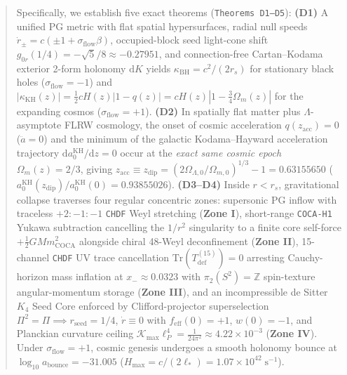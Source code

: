 \documentclass[11pt,a4paper]{article}
\theoremstyle{remark}
\begin{document}
\begin{abstract}
Specifically, we establish five exact theorems (\texttt{Theorems D1--D5}):
\textbf{(D1)} A unified PG metric with flat spatial hypersurfaces, radial null speeds $\dot{r}_\pm = c(\pm 1 + \sigma_{\mathrm{flow}}\beta)$, occupied-block seed light-cone shift $g_{0r}(1/4) = -\sqrt{5}/8 \approx -0.27951$, and connection-free Cartan--Kodama exterior 2-form holonomy $\mathrm{d}K$ yields $\kappa_{\mathrm{BH}} = c^2/(2r_s)$ for stationary black holes ($\sigma_{\mathrm{flow}} = -1$) and $|\kappa_{\mathrm{KH}}(z)| = \frac{1}{2}cH(z)|1 - q(z)| = cH(z)|1 - \frac{3}{4}\Omega_m(z)|$ for the expanding cosmos ($\sigma_{\mathrm{flow}} = +1$).
\textbf{(D2)} In spatially flat matter plus $\Lambda$-asymptote FLRW cosmology, the onset of cosmic acceleration $q(z_{\mathrm{acc}}) = 0$ ($\ddot{a} = 0$) and the minimum of the galactic Kodama--Hayward acceleration trajectory $\mathrm{d}a_0^{\mathrm{KH}}/\mathrm{d}z = 0$ occur at the \emph{exact same cosmic epoch} $\Omega_m(z) = 2/3$, giving $z_{\mathrm{acc}} \equiv z_{\mathrm{dip}} = (2\Omega_{\Lambda,0}/\Omega_{m,0})^{1/3} - 1 = 0.63155650$ ($a_0^{\mathrm{KH}}(z_{\mathrm{dip}})/a_0^{\mathrm{KH}}(0) = 0.93855026$).
\textbf{(D3--D4)} Inside $r < r_s$, gravitational collapse traverses four regular concentric zones: supersonic PG inflow with traceless $+2:-1:-1$ \texttt{CHDF} Weyl stretching (\textbf{Zone I}), short-range \texttt{COCA-H1} Yukawa subtraction cancelling the $1/r^2$ singularity to a finite core self-force $+\frac{1}{2}GM m_{\mathrm{COCA}}^2$ alongside chiral 48-Weyl deconfinement (\textbf{Zone II}), 15-channel \texttt{CHDF} UV trace cancellation $\mathrm{Tr}(T_{\mathrm{def}}^{(15)}) = 0$ arresting Cauchy-horizon mass inflation at $x_- \approx 0.0323$ with $\pi_2(S^2) = \mathbb{Z}$ spin-texture angular-momentum storage (\textbf{Zone III}), and an incompressible de Sitter $K_4$ Seed Core enforced by Clifford-projector superselection $\Pi^2 = \Pi \implies r_{\mathrm{seed}} = 1/4$, $\dot{r} \equiv 0$ with $f_{\mathrm{eff}}(0) = +1$, $w(0) = -1$, and Planckian curvature ceiling $\mathcal{K}_{\max}\ell_P^4 = \frac{1}{24\pi^2} \approx 4.22 \times 10^{-3}$ (\textbf{Zone IV}). Under $\sigma_{\mathrm{flow}} = +1$, cosmic genesis undergoes a smooth holonomy bounce at $\log_{10} a_{\mathrm{bounce}} = -31.005$ ($H_{\max} = c/(2\ell_*) = 1.07 \times 10^{42}\;\mathrm{s}^{-1}$).

\end{abstract}
\end{document}
